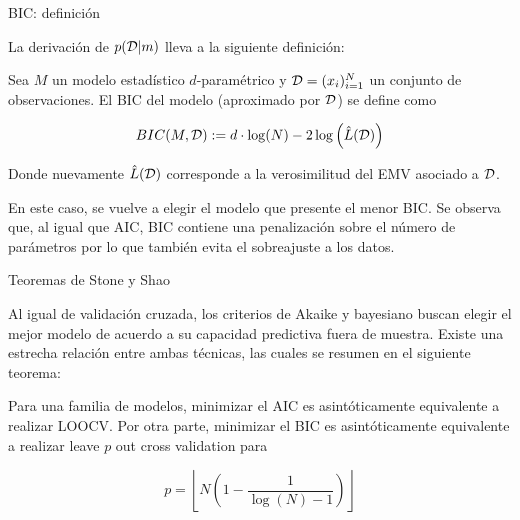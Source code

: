 \documentclass[9pt]{beamer}
\begin{document}
\begin{frame}{BIC: definición}

La derivación de $p({\mathcal D}|m)$ lleva a la siguiente definición:

\begin{definition}[BIC]
	Sea $M$ un modelo estadístico $d$-paramétrico y ${\mathcal D}=(x_i)_{i=1}^N$ un conjunto de observaciones. El BIC del modelo (aproximado por ${\mathcal D}$) se define como
	
	\begin{equation*}
		BIC(M,{\mathcal D}):= d\cdot\log(N) - 2\log\left(\hat{L}({\mathcal D})\right)
	\end{equation*}
	
	Donde nuevamente $\hat{L}({\mathcal D})$ corresponde a la verosimilitud del EMV asociado a ${\mathcal D}$.
\end{definition}\pause

En este caso, se vuelve a elegir el modelo que presente el menor BIC. Se observa que, al igual que AIC, BIC contiene una penalización sobre el número de parámetros por lo que también evita el sobreajuste a los datos.

\end{frame}

\begin{frame}{Teoremas de Stone y Shao}

Al igual de validación cruzada, los criterios de Akaike y bayesiano buscan elegir el mejor modelo de acuerdo a su capacidad predictiva fuera de muestra. Existe una estrecha relación entre ambas técnicas, las cuales se resumen en el siguiente teorema:

\begin{theorem} Para una familia de modelos, minimizar el AIC es asintóticamente equivalente a realizar LOOCV. Por otra parte, minimizar el BIC es asintóticamente equivalente a realizar leave $p$ out cross validation para

\begin{equation*}
	p=\left\lfloor N\left(1-\frac{1}{\log(N)-1}\right)\right\rfloor
\end{equation*}
	
\end{theorem}

\end{frame}
\end{document}
